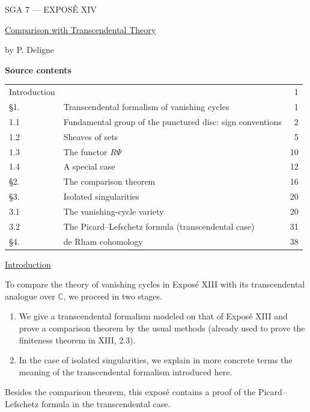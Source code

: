 \clearpage
\begin{center}
{\large SGA 7 --- EXPOS\'E XIV}\par
\vspace{2em}
{\Large\underline{\underline{Comparison with Transcendental Theory}}}\par
\vspace{1.5em}
{\large by P. Deligne}
\end{center}

\medskip
\noindent\textbf{Source contents}
\begin{center}
\begin{tabular}{@{}llr@{}}
Introduction && 1\\
\S1. & Transcendental formalism of vanishing cycles & 1\\
1.1 & Fundamental group of the punctured disc: sign conventions & 2\\
1.2 & Sheaves of sets & 5\\
1.3 & The functor $R\Psi$ & 10\\
1.4 & A special case & 12\\
\S2. & The comparison theorem & 16\\
\S3. & Isolated singularities & 20\\
3.1 & The vanishing-cycle variety & 20\\
3.2 & The Picard--Lefschetz formula (transcendental case) & 31\\
\S4. & de Rham cohomology & 38
\end{tabular}
\end{center}

\medskip
\underline{Introduction}

To compare the theory of vanishing cycles in Expos\'e XIII with its
transcendental analogue over $\mathbb C$, we proceed in two stages.

\begin{enumerate}[label=(\alph*),leftmargin=2.6em]
\item We give a transcendental formalism modeled on that of
Expos\'e XIII and prove a comparison theorem by the usual methods
(already used to prove the finiteness theorem in XIII, 2.3).

\item In the case of isolated singularities, we explain in more
concrete terms the meaning of the transcendental formalism introduced
here.
\end{enumerate}

Besides the comparison theorem, this expos\'e contains a proof of the
Picard--Lefschetz formula in the transcendental case.

